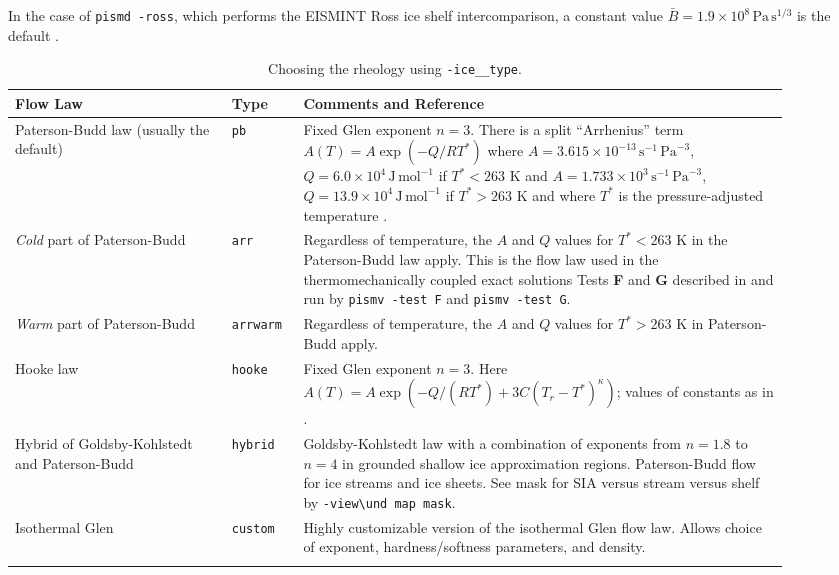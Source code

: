 \documentclass[11pt,final]{amsart}
\renewcommand{\t}[1]{\texttt{#1}}
\newcommand{\und}{\_\!\_}
\begin{document}
In the case of \verb|pismd -ross|, which performs the EISMINT Ross ice shelf intercomparison, a constant value $\bar B = 1.9 \times 10^8 \, \text{Pa}\, \text{s}^{1/3}$ is the default \cite{MacAyealetal}.

\begin{table}[ht]
\caption{Choosing the rheology using \t{-ice\und type}.}\label{tab:flowlaw}
\small
\begin{tabular}{p{0.25\linewidth}p{0.08\linewidth}p{0.57\linewidth}}\hline
\textbf{Flow Law} & \textbf{Type} & \textbf{Comments and Reference} \\ \hline
Paterson-Budd law (usually the default)  &  \t{pb} &   Fixed Glen exponent $n=3$.  There is a split ``Arrhenius'' term $A(T) = A \exp(-Q/RT^*)$ where \mbox{$A = 3.615 \times 10^{-13}\, \text{s}^{-1}\, \text{Pa}^{-3}$}, \mbox{$Q = 6.0 \times 10^4\, \text{J}\, \text{mol}^{-1}$} if $T^* < 263$ K and
 \mbox{$A = 1.733 \times 10^{3}\, \text{s}^{-1}\, \text{Pa}^{-3}$}, \mbox{$Q = 13.9 \times 10^4\, \text{J}\, \text{mol}^{-1}$} if $T^* > 263$ K and where $T^*$ is the pressure-adjusted temperature \cite{PatersonBudd}. \\
\emph{Cold} part of Paterson-Budd &  \t{arr} &   Regardless of temperature, the $A$ and $Q$ values for $T^*<263$ K in  the Paterson-Budd law apply.  This is the flow law used in the thermomechanically coupled exact solutions Tests \textbf{F} and \textbf{G} described in \cite{BBL,BB} and run by \verb|pismv -test F| and \verb|pismv -test G|. \\

\emph{Warm} part of Paterson-Budd     &  \t{arrwarm} & Regardless of temperature, the $A$ and $Q$ values for $T^*>263$ K in Paterson-Budd apply.\\
Hooke law   &  \t{hooke} &  Fixed Glen exponent $n=3$.  Here  $A(T) = A \exp(-Q/(RT^*) + 3C (T_r - T^*)^\kappa)$; values of  constants as in \cite{Hooke,PayneBaldwin}.\\
Hybrid of Goldsby-Kohlstedt and Paterson-Budd & \t{hybrid} &     Goldsby-Kohlstedt law with a combination of exponents  from $n=1.8$ to $n=4$ \cite{GoldsbyKohlstedt} in grounded  shallow ice approximation regions.  Paterson-Budd flow  for ice streams and ice sheets. See mask for SIA versus stream versus shelf by \verb|-view\und map mask|. \\
Isothermal Glen & \t{custom} & Highly customizable version of the isothermal Glen flow law.  Allows choice of exponent, hardness/softness parameters, and density. \\
\hline
\normalsize	
\end{tabular}
\end{table}
\end{document}
